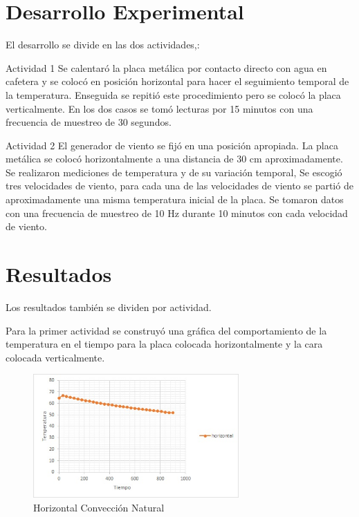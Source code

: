\documentclass[12pt]{article}
\begin{document}
\section{Desarrollo Experimental}
\vspace{-0.5cm}
El desarrollo se divide en las dos actividades,:


Actividad 1 
Se calentaró la placa metálica por contacto directo con agua en cafetera y se colocó en posición horizontal para hacer el
seguimiento temporal de la temperatura. Enseguida se repitió este
procedimiento pero se colocó la placa verticalmente. En los dos
casos se tomó lecturas por 15 minutos con una frecuencia de muestreo de 30 segundos. 

Actividad 2 
El generador de viento se fijó en una posición apropiada. La placa metálica se colocó horizontalmente a una distancia de 30 cm aproximadamente.
Se realizaron mediciones de temperatura y de su variación temporal, 
Se escogió tres velocidades de viento, para cada una de las velocidades de viento se partió de aproximadamente una misma temperatura inicial de la placa. 
Se tomaron datos con una frecuencia de muestreo de 10 Hz durante 10 minutos con cada velocidad de viento.

\pagebreak
\section{Resultados}
Los resultados también se dividen por actividad.

Para la primer actividad se construyó una gráfica del comportamiento de la temperatura en el tiempo para la placa colocada horizontalmente y la cara colocada verticalmente.

\begin{figure}[H]
\begin{center}
\includegraphics[width=0.7\textwidth]{horizontal1.jpg}  
\caption{Horizontal Convección Natural}
\label{uno}
\end{center}
\end{figure}
\end{document}
